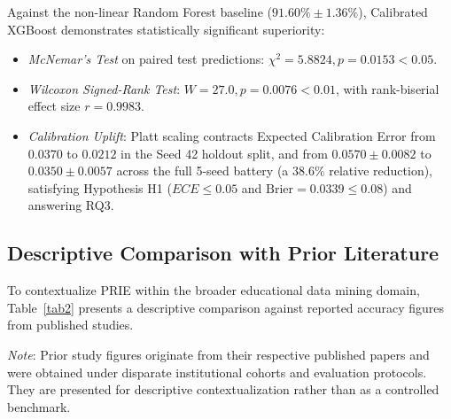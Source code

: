 \documentclass[conference]{IEEEtran}
\begin{document}
Against the non-linear Random Forest baseline ($91.60\% \pm 1.36\%$), Calibrated XGBoost demonstrates statistically significant superiority:
\begin{itemize}
\item \textit{McNemar's Test} on paired test predictions: $\chi^2 = 5.8824, p = 0.0153 < 0.05$.
\item \textit{Wilcoxon Signed-Rank Test}: $W = 27.0, p = 0.0076 < 0.01$, with rank-biserial effect size $r = 0.9983$.
\item \textit{Calibration Uplift}: Platt scaling contracts Expected Calibration Error from $0.0370$ to $0.0212$ in the Seed 42 holdout split, and from $0.0570 \pm 0.0082$ to $0.0350 \pm 0.0057$ across the full 5-seed battery (a $38.6\%$ relative reduction), satisfying Hypothesis H1 ($ECE \le 0.05$ and $\text{Brier} = 0.0339 \le 0.08$) and answering RQ3.
\end{itemize}

\subsection{Descriptive Comparison with Prior Literature}

To contextualize PRIE within the broader educational data mining domain, Table~\ref{tab2} presents a descriptive comparison against reported accuracy figures from published studies.

\begin{table}[htbp]
\caption{Descriptive Comparison with Reported Results from Prior Studies}
\begin{center}
\label{tab2}
\end{center}
\vspace{-1ex}
\footnotesize{\textit{Note}: Prior study figures originate from their respective published papers and were obtained under disparate institutional cohorts and evaluation protocols. They are presented for descriptive contextualization rather than as a controlled benchmark.}
\end{table}
\end{document}
